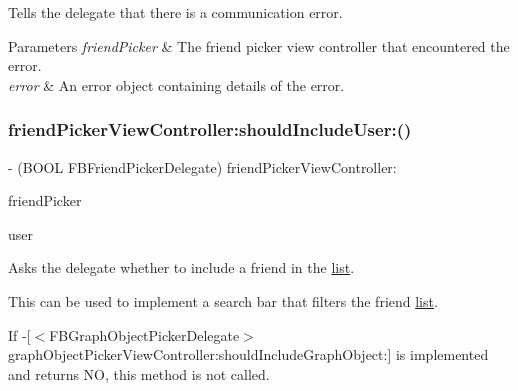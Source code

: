 Tells the delegate that there is a communication error.


\begin{DoxyParams}{Parameters}
{\em friend\+Picker} & The friend picker view controller that encountered the error. \\
\hline
{\em error} & An error object containing details of the error. \\
\hline
\end{DoxyParams}
\mbox{\label{protocolFBFriendPickerDelegate_01-p_a7c521c53cb2cace336ac14fb4d111f89}} 
\subsubsection{\texorpdfstring{friend\+Picker\+View\+Controller\+:should\+Include\+User\+:()}{friendPickerViewController:shouldIncludeUser:()}\hspace{0.1cm}{\footnotesize\ttfamily [1/5]}}
{\footnotesize\ttfamily -\/ (B\+O\+OL F\+B\+Friend\+Picker\+Delegate) friend\+Picker\+View\+Controller\+: \begin{DoxyParamCaption}\item[{(\hyperlink{interfaceFBFriendPickerViewController}{F\+B\+Friend\+Picker\+View\+Controller} $\ast$)}]{friend\+Picker }\item[{shouldIncludeUser:(id$<$ \hyperlink{protocolFBGraphUser-p}{F\+B\+Graph\+User} $>$)}]{user }\end{DoxyParamCaption}\hspace{0.3cm}{\ttfamily [optional]}}

Asks the delegate whether to include a friend in the \hyperlink{protocollist-p}{list}.

This can be used to implement a search bar that filters the friend \hyperlink{protocollist-p}{list}.

If -\/\mbox{[}$<$\+F\+B\+Graph\+Object\+Picker\+Delegate$>$ graph\+Object\+Picker\+View\+Controller\+:should\+Include\+Graph\+Object\+:\mbox{]} is implemented and returns NO, this method is not called.


